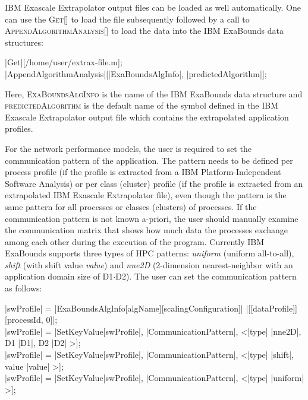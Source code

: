 IBM Exascale Extrapolator output files can be loaded as well automatically. One can use the \textsc{Get[]} to load the file subsequently followed by a call to \textsc{AppendAlgorithmAnalysis[]} to load the data into the IBM ExaBounds data structures:
\begin{mma}
  \In |Get|[/home/user/extrax-file.m]; \\
  \In |AppendAlgorithmAnalysis|[|ExaBoundsAlgInfo|, |predictedAlgorithm|]; \\
\end{mma}
Here, \textsc{ExaBoundsAlgInfo} is the name of the IBM ExaBounds data structure and \textsc{predictedAlgorithm} is the default name of the symbol defined in the IBM Exascale Extrapolator output file which contains the extrapolated application profiles.

For the network performance models, the user is required to set the communication pattern of the application. The pattern needs to be defined per process profile (if the profile is extracted from a IBM Platform-Independent Software Analysis) or per class (cluster) profile (if the profile is extracted from an extrapolated IBM Exascale Extrapolator file), even though the pattern is the same pattern for all processes or classes (clusters) of processes. If the communication pattern is not known a-priori, the user should manually examine the communication matrix that shows how much data the processes exchange among each other during the execution of the program. Currently IBM ExaBounds supports three types of HPC patterns: \textit{uniform} (uniform all-to-all), \textit{shift} (with shift value \textit{value}) and \textit{nne2D} (2-dimension nearest-neighbor with an application domain size of D1$\cdot$D2). The user can set the communication pattern as follows:

\begin{mma}
	\In |swProfile| = |ExaBoundsAlgInfo[algName][scalingConfiguration]| \linebreak |[[dataProfile]][{processId, 0}]|; \\
	\In |swProfile| = |SetKeyValue[swProfile|, |CommunicationPattern|, \linebreak
	<|type| \rightarrow  {}|nne2D|,  D1 \rightarrow |D1|,  D2  \rightarrow |D2| \mathtt{\mid}>]; \\
	\In |swProfile| = |SetKeyValue[swProfile|, |CommunicationPattern|, \linebreak
	<|type| \rightarrow  {}|shift|,  value \rightarrow |value| \mathtt{\mid}>]; \\
	\In |swProfile| = |SetKeyValue[swProfile|, |CommunicationPattern|, \linebreak
	<|type| \rightarrow  {}|uniform| \mathtt{\mid}>]; \\
\end{mma}

